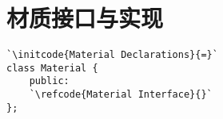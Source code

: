 \section{材质接口与实现}\label{sec:材质接口与实现}

\label{code:overview_Material}
\begin{lstlisting}
`\initcode{Material Declarations}{=}`
class Material {
    public:
    `\refcode{Material Interface}{}`
};
\end{lstlisting}